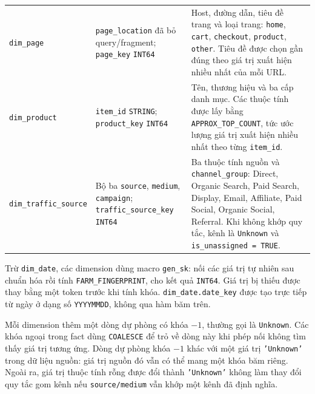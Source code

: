 \begin{xltabular}{\textwidth}{>{\raggedright\arraybackslash}p{3.5cm} >{\raggedright\arraybackslash}p{4.5cm} >{\raggedright\arraybackslash}X}
\texttt{dim\_page}
& \texttt{page\_location} đã bỏ query/fragment; \texttt{page\_key} \texttt{INT64}
& Host, đường dẫn, tiêu đề trang và loại trang: \texttt{home}, \texttt{cart}, \texttt{checkout}, \texttt{product}, \texttt{other}. Tiêu đề được chọn gần đúng theo giá trị xuất hiện nhiều nhất của mỗi URL. \\

\texttt{dim\_product}
& \texttt{item\_id} \texttt{STRING}; \texttt{product\_key} \texttt{INT64}
& Tên, thương hiệu và ba cấp danh mục. Các thuộc tính được lấy bằng \texttt{APPROX\_TOP\_COUNT}, tức ước lượng giá trị xuất hiện nhiều nhất theo từng \texttt{item\_id}. \\

\texttt{dim\_traffic\_source}
& Bộ ba \texttt{source}, \texttt{medium}, \texttt{campaign}; \texttt{traffic\_source\_key} \texttt{INT64}
& Ba thuộc tính nguồn và \texttt{channel\_group}: Direct, Organic Search, Paid Search, Display, Email, Affiliate, Paid Social, Organic Social, Referral. Khi không khớp quy tắc, kênh là \texttt{Unknown} và \texttt{is\_unassigned = TRUE}. \\
\end{xltabular}

Trừ \texttt{dim\_date}, các dimension dùng macro \texttt{gen\_sk}: nối các giá trị tự nhiên sau chuẩn hóa rồi tính \texttt{FARM\_FINGERPRINT}, cho kết quả \texttt{INT64}. Giá trị bị thiếu được thay bằng một token trước khi tính khóa. \texttt{dim\_date.date\_key} được tạo trực tiếp từ ngày ở dạng số \texttt{YYYYMMDD}, không qua hàm băm trên. \medskip

Mỗi dimension thêm một dòng dự phòng có khóa $-1$, thường gọi là \texttt{Unknown}. Các khóa ngoại trong fact dùng \texttt{COALESCE} để trỏ về dòng này khi phép nối không tìm thấy giá trị tương ứng. Dòng dự phòng khóa $-1$ khác với một giá trị \texttt{'Unknown'} trong dữ liệu nguồn: giá trị nguồn đó vẫn có thể mang một khóa băm riêng. Ngoài ra, giá trị thuộc tính rỗng được đổi thành \texttt{'Unknown'} không làm thay đổi quy tắc gom kênh nếu \texttt{source/medium} vẫn khớp một kênh đã định nghĩa.

